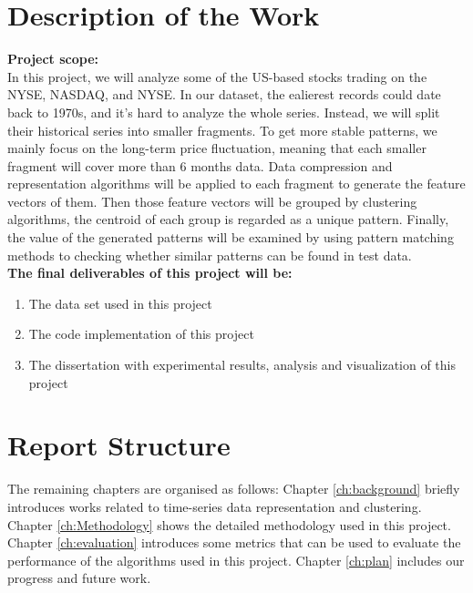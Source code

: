 \section{Description of the Work}
\textbf{Project scope:}\\
In this project, we will analyze some of the US-based stocks trading on the NYSE, NASDAQ, and NYSE. In our dataset, the ealierest records could date back to 1970s, and it's hard to analyze the whole series. Instead, we will split their historical series into smaller fragments. To get more stable patterns, we mainly focus on the long-term price fluctuation, meaning that each smaller fragment will cover more than 6 months data. Data compression and representation algorithms will be applied to each fragment to generate the feature vectors of them. Then those feature vectors will be grouped by clustering algorithms, the centroid of each group is regarded as a unique pattern. Finally, the value of the generated patterns will be examined by using pattern matching methods to checking whether similar patterns can be found in test data.
\\
\textbf{The final deliverables of this project will be:}
\begin{enumerate}
    \item The data set used in this project
    \item The code implementation of this project
    \item The dissertation with experimental results, analysis and visualization of this project
\end{enumerate}

\section{Report Structure}
The remaining chapters are organised as follows: Chapter \ref{ch:background} briefly introduces works related to time-series data representation and clustering. Chapter \ref{ch:Methodology} shows the detailed methodology used in this project. Chapter \ref{ch:evaluation} introduces some metrics that can be used to evaluate the performance of the algorithms used in this project. Chapter \ref{ch:plan} includes our progress and future work.
